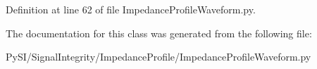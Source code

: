 Definition at line 62 of file Impedance\+Profile\+Waveform.\+py.



The documentation for this class was generated from the following file\+:\begin{DoxyCompactItemize}
\item 
Py\+S\+I/\+Signal\+Integrity/\+Impedance\+Profile/Impedance\+Profile\+Waveform.\+py\end{DoxyCompactItemize}
